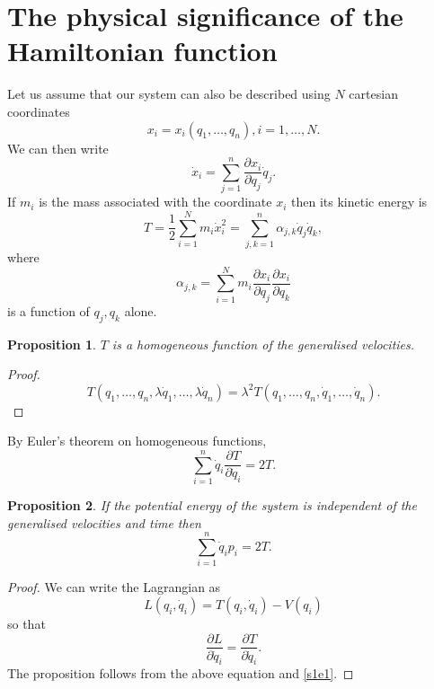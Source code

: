 \documentclass{article}
\numberwithin{equation}{section}
\theoremstyle{plain}
\numberwithin{thm}{section}
\theoremstyle{plain}
\newtheorem{prop}{Proposition}
\numberwithin{prop}{section}
\theoremstyle{definition}
\numberwithin{defn}{section}
\theoremstyle{remark}
\begin{document}
\section{The physical significance of the Hamiltonian function}\label{s2}
Let us assume that our system can also be described using $N$ cartesian
coordinates
\begin{equation}\label{s2e1}
x_i = x_i(q_1, \ldots, q_n), i = 1, \ldots, N.
\end{equation}
We can then write
\begin{equation}\label{s2e2}
\dot{x}_i = \sum_{j=1}^n\frac{\partial x_i}{\partial q_j}\dot{q}_j.
\end{equation}
If $m_i$ is the mass associated with the coordinate $x_i$ then its kinetic 
energy is
\begin{equation}\label{s2e3}
T = \frac{1}{2}\sum_{i=1}^N m_i\dot{x}_i^2 = 
\sum_{j,k=1}^n \alpha_{j,k}\dot{q}_j\dot{q}_k,
\end{equation}
where
\begin{equation}\label{s2e4}
\alpha_{j, k} = \sum_{i=1}^N m_i\frac{\partial x_i}{\partial q_j}
\frac{\partial x_i}{\partial q_k}
\end{equation}
is a function of $q_j, q_k$ alone.
\begin{prop}\label{s2p1}
$T$ is a homogeneous function of the generalised velocities.
\end{prop}
\begin{proof}
\[
T(q_1, \ldots, q_n, \lambda\dot{q}_1, \ldots, \lambda\dot{q}_n) = 
\lambda^2 T(q_1, \ldots, q_n, \dot{q}_1, \ldots, \dot{q}_n).
\]
\end{proof}
By Euler's theorem on homogeneous functions,
\begin{equation}\label{s2e5}
\sum_{i=1}^n \dot{q}_i\frac{\partial T}{\partial\dot{q}_i} = 2T.
\end{equation}
\begin{prop}\label{s2p2}
If the potential energy of the system is independent of the generalised
velocities and time then
\[
\sum_{i=1}^n \dot{q}_ip_i = 2T.
\]
\end{prop}
\begin{proof}
We can write the Lagrangian as
\[
L(q_i, \dot{q}_i) = T(q_i, \dot{q}_i) - V(q_i)
\]
so that
\[
\frac{\partial L}{\partial\dot{q}_i} = \frac{\partial T}{\partial\dot{q}_i}.
\]
The proposition follows from the above equation and \eqref{s1e1}.
\end{proof}
\end{document}
